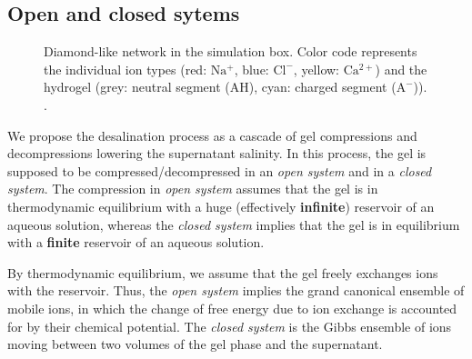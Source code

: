 \documentclass[journal,article,submit,pdftex,moreauthors]{Definitions/mdpi}
\newcommand{\A}{\mathrm{A^-}}
\newcommand{\AH}{\mathrm{AH}}
\newcommand{\cl}{\mathrm{Cl^-}}
\newcommand{\na}{\mathrm{Na^+}}
\newcommand{\ca}{\mathrm{Ca^{2+}}}
\begin{document}
\subsection{Open and closed sytems}
\begin{figure}[h]
	\centering
	\caption{Diamond-like network in the simulation box. Color code represents
		the individual ion types (red: $\na$, blue: $\cl$, yellow: $\ca$)
		and the hydrogel (grey: neutral segment ($\AH$), cyan: charged segment
		($\A$)). \label{fig:open and closed}.}
\end{figure}

We propose the desalination process as a cascade of gel compressions and decompressions lowering the  supernatant salinity.
In this process, the gel is supposed to be compressed/decompressed in an \emph{open system} and in a \emph{closed system}.
The compression in \emph{open system} assumes that the gel is in thermodynamic equilibrium with a huge (effectively \textbf{infinite}) reservoir of an aqueous solution, whereas 
the \emph{closed system} implies that the gel is in equilibrium with a \textbf{finite} reservoir of an aqueous solution.  

By thermodynamic equilibrium, we assume that the gel freely exchanges ions with the reservoir.
Thus, the \emph{open system} implies the grand canonical ensemble of mobile ions, in which the change of free energy due to ion exchange is accounted for by their chemical potential.
The \emph{closed system} is the Gibbs ensemble of ions moving between two volumes of the gel phase and the supernatant.
\end{document}
